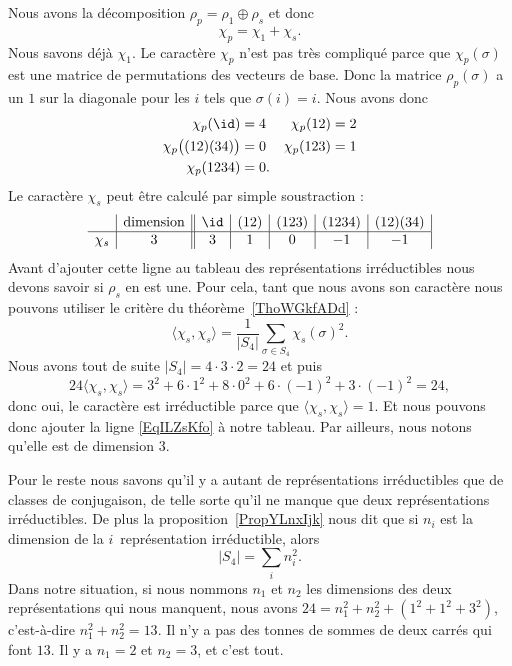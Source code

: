 Nous avons la décomposition \( \rho_p=\rho_1\oplus \rho_s\) et donc
\begin{equation}
    \chi_p=\chi_1+\chi_s.
\end{equation}
Nous savons déjà \( \chi_1\). Le caractère \( \chi_p\) n'est pas très compliqué parce que \( \chi_p(\sigma)\) est une matrice de permutations des vecteurs de base. Donc la matrice \( \rho_p(\sigma)\) a un \( 1 \) sur la diagonale pour les \( i\) tels que \( \sigma(i)=i\). Nous avons donc
\begin{subequations}
    \begin{align}
    \chi_p(\id)&=4&\chi_p(12)&=2\\
    \chi_p\big( (12)(34) \big)&=0&\chi_p(123)&=1\\
    \chi_p(1234)&=0.
    \end{align}
\end{subequations}
Le caractère \( \chi_s\) peut être calculé par simple soustraction :
\begin{equation}   \label{EqILZsKfo}
    \begin{array}[]{c|c||c|c|c|c|c|}
        &\text{dimension}&\id&(12)&(123)&(1234)&(12)(34)\\
          \hline
          \chi_s&3&3&1&0&-1&-1\\
    \end{array}
\end{equation}
Avant d'ajouter cette ligne au tableau des représentations irréductibles nous devons savoir si \( \rho_s\) en est une. Pour cela, tant que nous avons son caractère nous pouvons utiliser le critère du théorème~\ref{ThoWGkfADd} :
\begin{equation}
    \langle \chi_s, \chi_s\rangle =\frac{1}{ | S_4 | }\sum_{\sigma\in S_4}\chi_s(\sigma)^2.
\end{equation}
Nous avons tout de suite \( | S_4 |=4\cdot 3\cdot 2=24\) et puis
\begin{equation}
    24\langle \chi_s, \chi_s\rangle =3^2+6\cdot 1^2+8\cdot 0^2+6\cdot(-1)^2+3\cdot (-1)^2=24,
\end{equation}
donc oui, le caractère est irréductible parce que \( \langle \chi_s, \chi_s\rangle =1\). Et nous pouvons donc ajouter la ligne \eqref{EqILZsKfo} à notre tableau. Par ailleurs, nous notons qu'elle est de dimension \( 3\).

Pour le reste nous savons qu'il y a autant de représentations irréductibles que de classes de conjugaison, de telle sorte qu'il ne manque que deux représentations irréductibles. De plus la proposition~\ref{PropYLnxIjk} nous dit que si \( n_i\) est la dimension de la \( i\)\ieme\ représentation irréductible, alors
\begin{equation}
    | S_4 |=\sum_in_i^2.
\end{equation}
Dans notre situation, si nous nommons \( n_1\) et \( n_2\) les dimensions des deux représentations qui nous manquent, nous avons \( 24=n_1^2+n_2^2+(1^2+1^2+3^2)\), c'est-à-dire \( n_1^2+n_2^2=13\). Il n'y a pas des tonnes de sommes de deux carrés qui font \( 13\). Il y a \( n_1=2\) et \( n_2=3\), et c'est tout.

